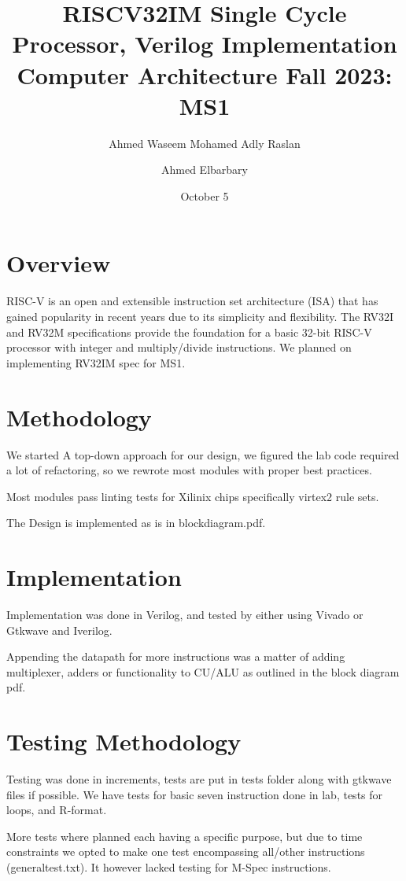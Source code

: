 \documentclass{article}
\title{RISCV32IM Single Cycle Processor, Verilog Implementation \\ \vspace{0.2cm}\normalsize Computer Architecture Fall 2023: MS1 }
\author{Ahmed Waseem Mohamed Adly Raslan \and Ahmed Elbarbary}
\date{October 5}
\begin{document}
\maketitle  
\tableofcontents

\break

\section{Overview} 
\quad RISC-V is an open and extensible instruction set architecture (ISA) that has gained popularity in recent years due to its simplicity and flexibility. The RV32I and RV32M specifications provide the foundation for a basic 32-bit RISC-V processor with integer and multiply/divide instructions. We planned on implementing RV32IM spec for MS1.

\section{Methodology} 
\quad We started A top-down approach for our design, we figured the lab code required a lot of refactoring, so we rewrote most modules with proper best practices. 

Most modules pass linting tests for Xilinix chips specifically virtex2 rule sets.  

The Design is implemented as is in blockdiagram.pdf.

\section*{Implementation}
\quad Implementation was done in Verilog, and tested by either using Vivado or Gtkwave and Iverilog. 

Appending the datapath for more instructions was a matter of adding multiplexer, adders or functionality to CU/ALU as outlined in the block diagram pdf.

\section{Testing Methodology}
\quad Testing was done in increments, tests are put in tests folder along with gtkwave files if possible. We have tests for basic seven instruction done in lab, tests for loops, and R-format. 

More tests where planned each having a specific purpose, but due to time constraints we opted to make one test encompassing all/other instructions (generaltest.txt). It however lacked testing for M-Spec instructions.  
\end{document}
